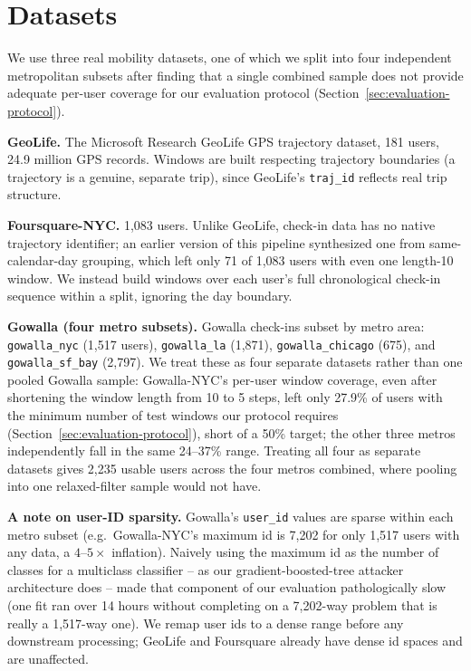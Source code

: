 \section{Datasets}
\label{sec:datasets}


We use three real mobility datasets, one of which we split into four
independent metropolitan subsets after finding that a single combined
sample does not provide adequate per-user coverage for our evaluation
protocol (Section~\ref{sec:evaluation-protocol}).

\textbf{GeoLife.} The Microsoft Research GeoLife GPS trajectory
dataset, 181 users, 24.9 million GPS records. Windows are built
respecting trajectory boundaries (a trajectory is a genuine, separate
trip), since GeoLife's \texttt{traj\_id} reflects real trip structure.

\textbf{Foursquare-NYC.} 1,083 users. Unlike GeoLife, check-in data has
no native trajectory identifier; an earlier version of this pipeline
synthesized one from same-calendar-day grouping, which left only 71 of
1,083 users with even one length-10 window. We instead build windows
over each user's full chronological check-in sequence within a split,
ignoring the day boundary.

\textbf{Gowalla (four metro subsets).} Gowalla check-ins subset by
metro area: \texttt{gowalla\_nyc} (1,517 users), \texttt{gowalla\_la}
(1,871), \texttt{gowalla\_chicago} (675), and \texttt{gowalla\_sf\_bay}
(2,797). We treat these as four separate datasets rather than one
pooled Gowalla sample: Gowalla-NYC's per-user window coverage, even
after shortening the window length from 10 to 5 steps, left only 27.9\%
of users with the minimum number of test windows our protocol requires
(Section~\ref{sec:evaluation-protocol}), short of a 50\% target; the
other three metros independently fall in the same 24--37\% range.
Treating all four as separate datasets gives 2,235 usable users across
the four metros combined, where pooling into one relaxed-filter sample
would not have.

\textbf{A note on user-ID sparsity.} Gowalla's \texttt{user\_id} values
are sparse within each metro subset (e.g.\ Gowalla-NYC's maximum id is
7,202 for only 1,517 users with any data, a $4$--$5\times$ inflation).
Naively using the maximum id as the number of classes for a
multiclass classifier -- as our gradient-boosted-tree attacker
architecture does -- made that component of our evaluation
pathologically slow (one fit ran over 14 hours without completing on a
7,202-way problem that is really a 1,517-way one). We remap user ids to
a dense range before any downstream processing; GeoLife and Foursquare
already have dense id spaces and are unaffected.
